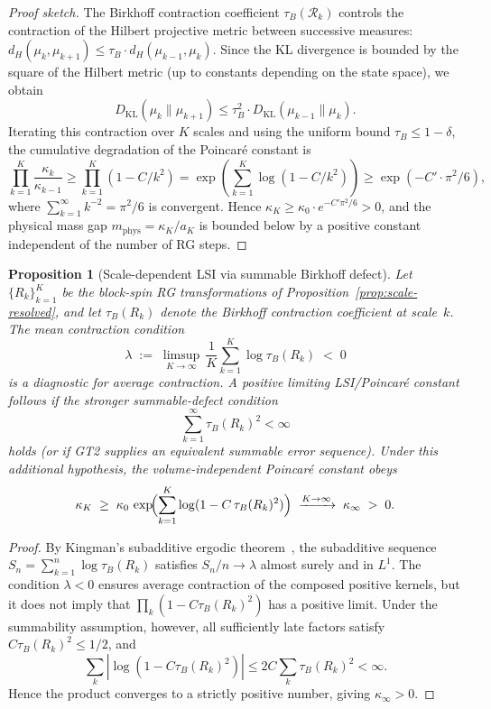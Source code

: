 \documentclass[12pt,a4paper]{article}
\theoremstyle{definition}
\theoremstyle{plain}
\newtheorem{proposition}[definition]{Proposition}
\theoremstyle{remark}
\begin{document}
\begin{proof}[Proof sketch]
The Birkhoff contraction coefficient $\tau_B(\mathcal{R}_k)$ controls the contraction of the Hilbert projective metric between successive measures: $d_H(\mu_k, \mu_{k+1}) \leq \tau_B \cdot d_H(\mu_{k-1}, \mu_k)$. Since the KL divergence is bounded by the square of the Hilbert metric (up to constants depending on the state space), we obtain
\[
D_{\mathrm{KL}}(\mu_k \| \mu_{k+1}) \leq \tau_B^2 \cdot D_{\mathrm{KL}}(\mu_{k-1} \| \mu_k).
\]
Iterating this contraction over $K$ scales and using the uniform bound $\tau_B \leq 1 - \delta$, the cumulative degradation of the Poincar\'e constant is
\[
\prod_{k=1}^{K} \frac{\kappa_k}{\kappa_{k-1}} \geq \prod_{k=1}^{K} (1 - C/k^2) = \exp\!\left(\sum_{k=1}^{K} \log(1 - C/k^2)\right) \geq \exp(-C' \cdot \pi^2/6),
\]
where $\sum_{k=1}^{\infty} k^{-2} = \pi^2/6$ is convergent. Hence $\kappa_K \geq \kappa_0 \cdot e^{-C'\pi^2/6} > 0$, and the physical mass gap $m_{\mathrm{phys}} = \kappa_K / a_K$ is bounded below by a positive constant independent of the number of RG steps.
\end{proof}

\begin{proposition}[Scale-dependent LSI via summable Birkhoff defect]\label{prop:kingman-lsi}
Let $\{R_k\}_{k=1}^K$ be the block-spin RG transformations of
Proposition~\ref{prop:scale-resolved}, and let
$\tau_B(R_k)$ denote the Birkhoff contraction coefficient at scale~$k$.
The mean contraction condition
\begin{equation}\label{eq:mean-contraction-lsi}
  \lambda \;:=\; \limsup_{K \to \infty}\,\frac{1}{K}\sum_{k=1}^{K}\log\tau_B(R_k) \;<\; 0
\end{equation}
is a diagnostic for average contraction. A positive limiting LSI/Poincar\'e
constant follows if the stronger summable-defect condition
\[
  \sum_{k=1}^\infty \tau_B(R_k)^2 < \infty
\]
holds (or if GT2 supplies an equivalent summable error sequence). Under this
additional hypothesis, the volume-independent Poincar\'e constant obeys
\[
  \kappa_K \;\geq\; \kappa_0\,\exp\!\Bigl(\sum_{k=1}^{K}\log(1 - C\,\tau_B(R_k)^2)\Bigr)
  \;\xrightarrow{K \to \infty}\; \kappa_\infty \;>\; 0 .
\]
\end{proposition}

\begin{proof}
By Kingman's subadditive ergodic theorem~\cite{Kingman1968},
the subadditive sequence $S_n = \sum_{k=1}^n \log\tau_B(R_k)$
satisfies $S_n/n \to \lambda$ almost surely and in $L^1$.
The condition $\lambda < 0$ ensures average contraction of the composed
positive kernels, but it does not imply that
$\prod_k(1-C\tau_B(R_k)^2)$ has a positive limit. Under the summability
assumption, however, all sufficiently late factors satisfy
$C\tau_B(R_k)^2\leq 1/2$, and
\[
  \sum_k |\log(1-C\tau_B(R_k)^2)|
  \leq 2C\sum_k \tau_B(R_k)^2 < \infty .
\]
Hence the product converges to a strictly positive number, giving
$\kappa_\infty>0$.
\end{proof}
\end{document}
